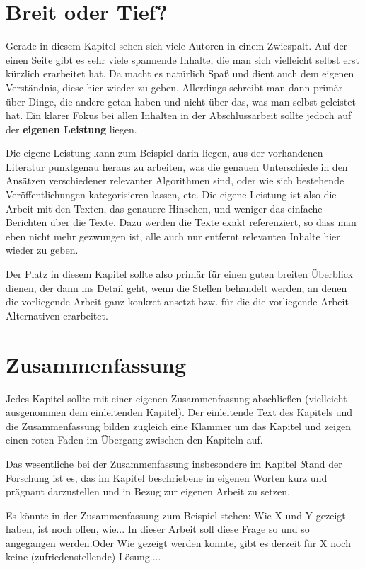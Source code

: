 \section{Breit oder Tief?} 

Gerade in diesem Kapitel sehen sich viele Autoren in einem Zwiespalt. Auf der
einen Seite gibt es sehr viele spannende Inhalte, die man sich vielleicht selbst
erst kürzlich erarbeitet hat. Da macht es natürlich Spaß und dient auch dem
eigenen Verständnis, diese hier wieder zu geben. Allerdings schreibt man dann
primär über Dinge, die andere getan haben und nicht über das, was man selbst
geleistet hat. Ein klarer Fokus bei allen Inhalten in der Abschlussarbeit sollte
jedoch auf der {\normalfont \bfseries eigenen Leistung} liegen. 

Die eigene Leistung kann zum Beispiel darin liegen, aus der vorhandenen
Literatur punktgenau heraus zu arbeiten, was die genauen Unterschiede in den Ansätzen
verschiedener relevanter Algorithmen sind, oder wie sich bestehende
Veröffentlichungen kategorisieren lassen, etc. Die eigene Leistung ist also die
Arbeit mit den Texten, das genauere Hinsehen, und weniger das einfache Berichten über die Texte. Dazu werden die Texte exakt referenziert, so dass man eben nicht mehr gezwungen ist, alle auch nur entfernt relevanten Inhalte hier wieder zu geben.

Der Platz in diesem Kapitel sollte also primär für einen guten breiten Überblick dienen, der dann ins Detail geht, wenn die Stellen behandelt werden, an denen die vorliegende Arbeit ganz konkret ansetzt bzw. für die die vorliegende Arbeit Alternativen erarbeitet.

\section{Zusammenfassung} 

Jedes Kapitel sollte mit einer eigenen Zusammenfassung abschließen (vielleicht
ausgenommen dem einleitenden Kapitel). Der einleitende Text des Kapitels und die
Zusammenfassung bilden zugleich eine Klammer um das Kapitel und zeigen einen
roten Faden im Übergang zwischen den Kapiteln auf. 

Das wesentliche bei der Zusammenfassung insbesondere im Kapitel {\emph Stand der
Forschung} ist es, das im Kapitel beschriebene in eigenen Worten kurz und prägnant
darzustellen und in Bezug zur eigenen Arbeit zu setzen.

Es könnte in der Zusammenfassung zum Beispiel stehen: \glqq Wie X und Y gezeigt
haben, ist noch offen, wie... In dieser Arbeit soll diese Frage so und so
angegangen werden.\grqq Oder \glqq Wie gezeigt werden konnte, gibt es derzeit für X
noch keine (zufriedenstellende) Lösung...\grqq.
